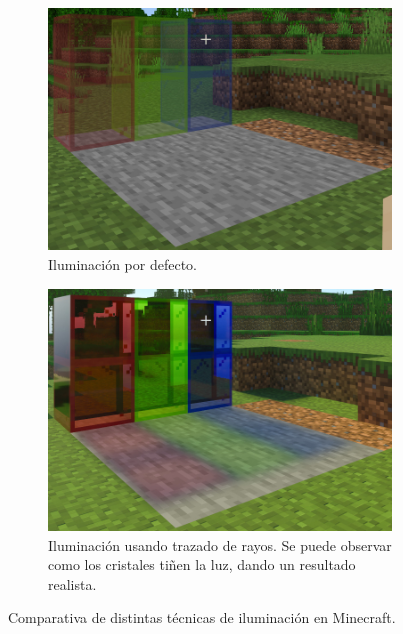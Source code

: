 \documentclass{article}
\begin{document}
\begin{figure}[H]
    \centering 
	\begin{subfigure}[t]{0.48\textwidth}
	    \centering
	    \includegraphics[width=\textwidth]{imagenes/minecraftvanilla.jpg}
        \caption{Iluminación por defecto.}
    \end{subfigure}
    \hfill
	\begin{subfigure}[t]{0.48\textwidth}
	    \centering
	    \includegraphics[width=\textwidth]{imagenes/minecraftrt.jpg}
        \caption{Iluminación usando trazado de rayos. Se puede observar como los cristales tiñen la luz, dando un resultado realista.}
    \end{subfigure}   
    \caption{Comparativa de distintas técnicas de iluminación en Minecraft.} 
\end{figure}
\end{document}
